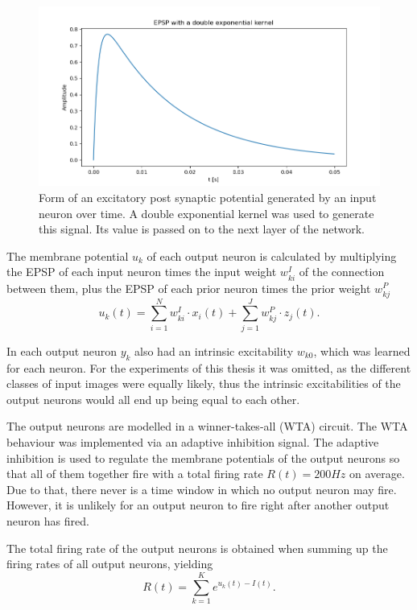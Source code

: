 \begin{figure}
  \includegraphics[width=\linewidth]{figures/XSpike.png}
  \caption{Form of an excitatory post synaptic potential generated by an input neuron over time. A double exponential kernel was used to generate this signal. Its value is passed on to the next layer of the network. }
  \label{fig:XSpike}
\end{figure}

The membrane potential $u_k$ of each output neuron is calculated by multiplying the EPSP of each input neuron times the input weight $w^{I}_{ki}$ of the connection between them, plus the EPSP of each prior neuron times the prior weight $w^{P}_{kj}$
\begin{equation}
\label{eqn:uk}
u_k(t) = \sum_{i=1}^N w^{I}_{ki} \cdot x_i(t) + \sum_{j=1}^J w^{P}_{kj} \cdot z_j(t).
\end{equation}

In \citet{nessler} each output neuron $y_k$ also had an intrinsic excitability $w_{k0}$, which was learned for each neuron. For the experiments of this thesis it was omitted, as the different classes of  input images were equally likely, thus the intrinsic excitabilities of the output neurons would all end up being equal to each other.

The output neurons are modelled in a winner-takes-all (WTA) circuit. The WTA behaviour was implemented via an adaptive inhibition signal. The adaptive inhibition is used to regulate the membrane potentials of the output neurons so that all of them together fire with a total firing rate $R(t) = 200 Hz$ on average. Due to that, there never is a time window in which no output neuron may fire. However, it is unlikely for an output neuron to fire right after another output neuron has fired.

The total firing rate of the output neurons is obtained when summing up the firing rates of all output neurons, yielding 
\begin{equation}
\label{eqn:R}
R(t) = \sum_{k=1}^K e^{u_k(t) - I(t)}.
\end{equation}

